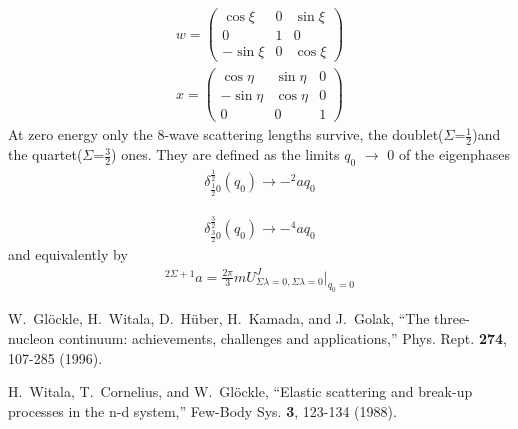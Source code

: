\documentclass[11pt,aps]{revtex4}
\begin{document}
\begin{equation}
\begin{split}
w=
\begin{pmatrix}
\cos \xi & 0 & \sin \xi\\
0 & 1 & 0\\
-\sin \xi & 0 & \cos \xi
\end{pmatrix}
\end{split}
\end{equation}
\begin{equation}
\begin{split}
x=
\begin{pmatrix}
\cos \eta & \sin \eta & 0\\
-\sin \eta & \cos \eta & 0\\
0 & 0 & 1
\end{pmatrix}
\end{split}
\end{equation}
At zero energy only the 8-wave scattering lengths survive, the doublet($\Sigma$=$\frac1 2$)and the quartet($\Sigma$=$\frac3 2$) ones. They are defined as the limits $q_0$ $\rightarrow$ 0 of the eigenphases
\begin{equation}
\begin{split}
\delta^{\frac 1 2}_{\frac 1 2 0}(q_0)\rightarrow -^2 aq_0
\end{split}
\end{equation}

\begin{equation}
\begin{split}
\delta^{\frac 3 2}_{\frac 3 2 0}(q_0)\rightarrow -^4 aq_0
\end{split}
\end{equation}
and equivalently by
\begin{equation}
\begin{split}
^{2\Sigma+1}a=\frac {2\pi} 3{} mU^{J}_{\Sigma \lambda=0,\Sigma \lambda=0}|_{q_0=0}
\end{split}
\end{equation}


\begin{thebibliography}{99}

W.~Gl\"ockle, H.~Witala, D.~H\"uber, H.~Kamada, and J.~Golak,
``The three-nucleon continuum: achievements, challenges and applications,'' Phys. Rept. \textbf{274}, 107-285 (1996).

H.~Witala, T.~Cornelius, and W.~Gl\"ockle,
``Elastic scattering and break-up processes in the n-d system,''
Few-Body Sys. \textbf{3}, 123-134 (1988).

\end{thebibliography}
\end{document}
